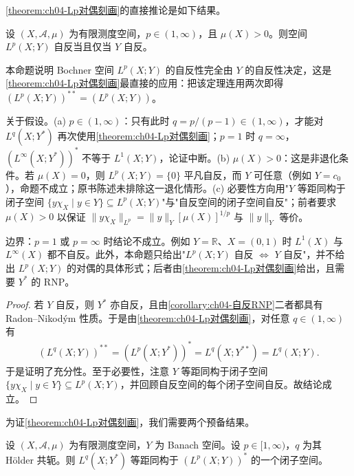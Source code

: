 \documentclass[../../main.tex]{subfiles}%
\begin{document}
\cref{theorem:ch04-Lp对偶刻画}的直接推论是如下结果。

\begin{proposition}\label{proposition:ch04-Lp自反}
设 $(X,\mathcal{A},\mu)$ 为有限测度空间，$p\in(1,\infty)$，且 $\mu(X)>0$。则空间 $L^p(X;Y)$ 自反当且仅当 $Y$ 自反。
\end{proposition}

\begin{remark}\label{remark:ch04-Lp自反}
本命题说明 Bochner 空间 $L^p(X;Y)$ 的自反性完全由 $Y$ 的自反性决定，这是\cref{theorem:ch04-Lp对偶刻画}最直接的应用：把该定理连用两次即得 $(L^p(X;Y))^{**}=(L^p(X;Y))$。

关于假设。(a) $p\in(1,\infty)$：只有此时 $q=p/(p-1)\in(1,\infty)$，才能对 $L^q(X;Y^*)$ 再次使用\cref{theorem:ch04-Lp对偶刻画}；$p=1$ 时 $q=\infty$，$(L^\infty(X;Y^*))^*$ 不等于 $L^1(X;Y)$，论证中断。(b) $\mu(X)>0$：这是非退化条件。若 $\mu(X)=0$，则 $L^p(X;Y)=\{0\}$ 平凡自反，而 $Y$ 可任意（例如 $Y=c_0$），命题不成立；原书陈述未排除这一退化情形。(c) 必要性方向用"$Y$ 等距同构于闭子空间 $\{y\chi_X\mid y\in Y\}\subseteq L^p(X;Y)$"与"自反空间的闭子空间自反"；前者要求 $\mu(X)>0$ 以保证 $\|y\chi_X\|_{L^p}=\|y\|_Y[\mu(X)]^{1/p}$ 与 $\|y\|_Y$ 等价。

边界：$p=1$ 或 $p=\infty$ 时结论不成立。例如 $Y=\mathbb{R}$、$X=(0,1)$ 时 $L^1(X)$ 与 $L^\infty(X)$ 都不自反。此外，本命题只给出"$L^p(X;Y)$ 自反 $\Leftrightarrow$ $Y$ 自反"，并不给出 $L^p(X;Y)$ 的对偶的具体形式；后者由\cref{theorem:ch04-Lp对偶刻画}给出，且需要 $Y^*$ 的 RNP。
\end{remark}

\begin{proof}
若 $Y$ 自反，则 $Y^*$ 亦自反，且由\cref{corollary:ch04-自反RNP}二者都具有 Radon--Nikodým 性质。于是由\cref{theorem:ch04-Lp对偶刻画}，对任意 $q\in(1,\infty)$ 有
\begin{align*}
(L^q(X;Y))^{**}=(L^p(X;Y^*))^*=L^q(X;Y^{**})=L^q(X;Y).
\end{align*}
于是证明了充分性。至于必要性，注意 $Y$ 等距同构于闭子空间 $\{y\chi_X\mid y\in Y\}\subseteq L^p(X;Y)$，并回顾自反空间的每个闭子空间自反。故结论成立。
\end{proof}

为证\cref{theorem:ch04-Lp对偶刻画}，我们需要两个预备结果。

\begin{proposition}\label{proposition:ch04-对偶等距嵌入}
设 $(X,\mathcal{A},\mu)$ 为有限测度空间，$Y$ 为 Banach 空间。设 $p\in[1,\infty)$，$q$ 为其 Hölder 共轭。则 $L^q(X;Y^*)$ 等距同构于 $(L^p(X;Y))^*$ 的一个闭子空间。
\end{proposition}
\end{document}
